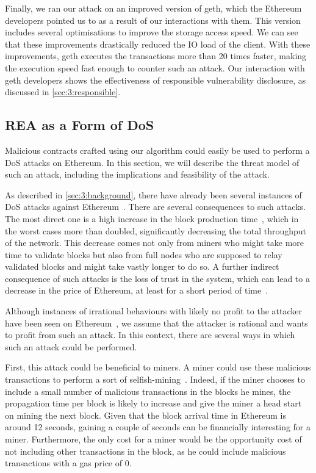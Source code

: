   Finally, we ran our attack on an improved version of geth, which the Ethereum developers pointed us to as a result of our interactions with them. This version includes several optimisations to improve the storage access speed. We can see that these improvements drastically reduced the IO load of the client. With these improvements, geth executes the transactions more than 20 times faster, making the execution speed fast enough to counter such an attack.
  Our interaction with geth developers shows the effectiveness of responsible vulnerability disclosure, as discussed in \autoref{sec:3:responsible}.

  \subsection{REA as a Form of DoS}
  Malicious contracts crafted using our algorithm could easily be used to perform a DoS attacks on Ethereum. In this section, we will describe the threat model of such an attack, including the implications and feasibility of the attack.

  As described in \autoref{sec:3:background}, there have already been several instances of DoS attacks against Ethereum~\cite{transaction-spam-attack,suicide-attack}.
  There are several consequences to such attacks.
  The most direct one is a high increase in the block production time~\cite{average-block-time}, which in the worst cases more than doubled, significantly decreasing the total throughput of the network.
  This decrease comes not only from miners who might take more time to validate blocks but also from full nodes who are supposed to relay validated blocks and might take vastly longer to do so.
  A further indirect consequence of such attacks is the loss of trust in the system, which can lead to a decrease in the price of Ethereum, at least for a short period of time~\cite{Chen2017Metering}.

  Although instances of irrational behaviours with likely no profit to the attacker have been seen on Ethereum~\cite{Breidenbach}, we assume that the attacker is rational and wants to profit from such an attack. In this context, there are several ways in which such an attack could be performed.

  First, this attack could be beneficial to miners. A miner could use these malicious transactions to perform a sort of selfish-mining~\cite{eyal2014majority}.
  Indeed, if the miner chooses to include a small number of malicious transactions in the blocks he mines, the propagation time per block is likely to increase and give the miner a head start on mining the next block.
  Given that the block arrival time in Ethereum is around 12 seconds, gaining a couple of seconds can be financially interesting for a miner. Furthermore, the only cost for a miner would be the opportunity cost of not including other transactions in the block, as he could include malicious transactions with a gas price of 0.


